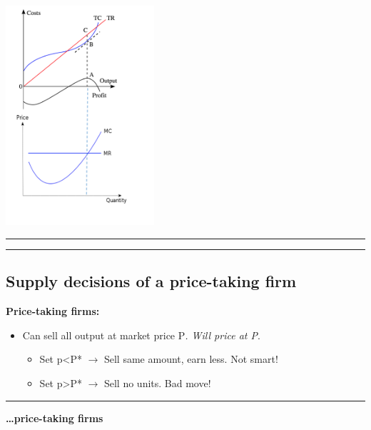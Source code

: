\documentclass[]{article}
\providecommand{\tightlist}{%
  \setlength{\itemsep}{0pt}\setlength{\parskip}{0pt}}
\begin{document}
\includegraphics[width=5.5cm]{picsfigs/mcmr_tc_tr.png}

\begin{center}\rule{0.5\linewidth}{\linethickness}\end{center}

\begin{center}\rule{0.5\linewidth}{\linethickness}\end{center}

\hypertarget{supply-decisions-of-a-price-taking-firm}{%
\subsection{Supply decisions of a price-taking
firm}\label{supply-decisions-of-a-price-taking-firm}}

\textbf{Price-taking firms:}

\begin{itemize}
\tightlist
\item
  Can sell all output at market price P\emph{. Will price at P}.

  \begin{itemize}
  \tightlist
  \item
    Set p\textless P* \(\rightarrow\) Sell same amount, earn less. Not
    smart!
  \item
    Set p\textgreater P* \(\rightarrow\) Sell no units. Bad move!
  \end{itemize}
\end{itemize}

\begin{center}\rule{0.5\linewidth}{\linethickness}\end{center}

\textbf{\ldots price-taking firms}
\end{document}
